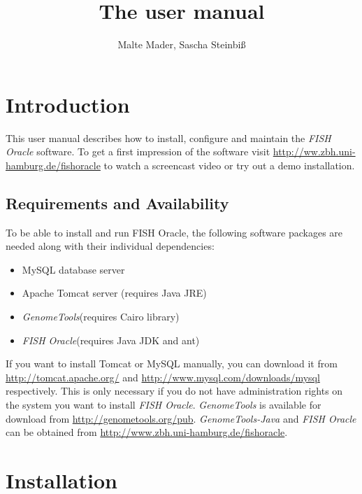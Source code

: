 \documentclass[11pt,final]{article}
\title{The \FO user manual}
\author{Malte Mader, Sascha Steinbi\ss}
\newcommand{\Gt}[0]{\emph{GenomeTools}\xspace}
\newcommand{\Gtj}[0]{\emph{GenomeTools-Java}\xspace}
\newcommand{\FO}[0]{\emph{FISH Oracle}\xspace}
\begin{document}
\maketitle
\tableofcontents

\section{Introduction}

This user manual describes how to install, configure and maintain the
\FO software. To get a first impression of the software visit
\url{http://ww.zbh.uni-hamburg.de/fishoracle} to watch a screencast video or
try out a demo installation.

\subsection{Requirements and Availability}

To be able to install and run FISH Oracle, the following software packages are
needed along with their individual dependencies:

\begin{itemize}
  \item MySQL database server
  \item Apache Tomcat server (requires Java JRE)
  \item \Gt (requires Cairo library)
  \item \FO (requires Java JDK and ant)
\end{itemize}

If you want to install Tomcat or MySQL manually, you can download it from
\url{http://tomcat.apache.org/} and \url{http://www.mysql.com/downloads/mysql}
respectively. This is only necessary if you do not have administration rights
on the system you want to install \FO.
\Gt is available for download from \url{http://genometools.org/pub}.
\Gtj and \FO can be obtained from \url{http://www.zbh.uni-hamburg.de/fishoracle}.

\section{Installation}
\end{document}
